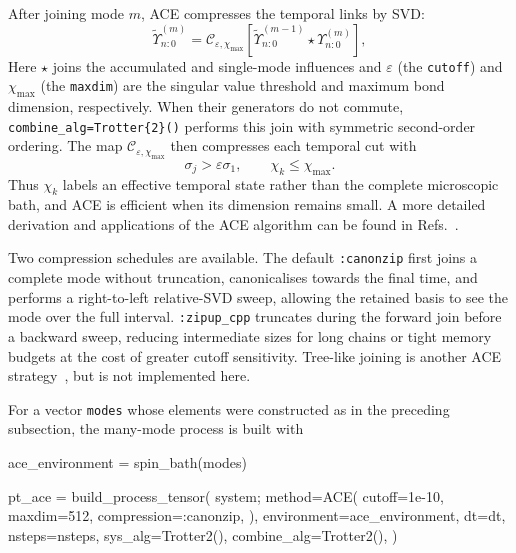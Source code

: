 After joining mode \(m\), ACE compresses the temporal links by SVD:
%
\begin{equation}
    \widetilde{\Upsilon}^{(m)}_{n:0}
    = \mathcal C_{\varepsilon,\chi_{\max}} \!\left[ \widetilde{\Upsilon}^{(m-1)}_{n:0} \star \Upsilon^{(m)}_{n:0} \right],
    \label{eq:ace-sequential-update}
\end{equation}
%
Here \(\star\) joins the accumulated and single-mode influences and \(\varepsilon\) (the \texttt{cutoff}) and \(\chi_{\max}\) (the \texttt{maxdim}) are the singular value threshold and maximum bond dimension, respectively.
When their generators do not commute, \texttt{combine\_alg=Trotter\{2\}()} performs this join with symmetric second-order ordering.
The map \(\mathcal C_{\varepsilon,\chi_{\max}}\) then compresses each temporal cut with
%
\begin{equation}
    \sigma_j>\varepsilon\sigma_1, \qquad \chi_k\leq\chi_{\max}.
    \label{eq:ace-relative-truncation}
\end{equation}
%
Thus \(\chi_k\) labels an effective temporal state rather than the complete microscopic bath, and ACE is efficient when its dimension remains small.
A more detailed derivation and applications of the ACE algorithm can be found in Refs.~\cite{Cygorek2022,CygorekGauger2024,LacroixReview2026}.

Two compression schedules are available.
The default \texttt{:canonzip} first joins a complete mode without truncation, canonicalises towards the final time, and performs a right-to-left relative-SVD sweep, allowing the retained basis to see the mode over the full interval.
\texttt{:zipup\_cpp} truncates during the forward join before a backward sweep, reducing intermediate sizes for long chains or tight memory budgets at the cost of greater cutoff sensitivity.
Tree-like joining is another ACE strategy~\cite{Cygorek2024Treelike}, but is not implemented here.

For a vector \texttt{modes} whose elements were constructed as in the preceding subsection, the many-mode process is built with
%
\begin{juliacode}[
  caption={ACE construction for a bath of independent microscopic modes.},
  label={lst:pt-build-ace},
]
ace_environment = spin_bath(modes)

pt_ace = build_process_tensor(
    system;
    method=ACE(
        cutoff=1e-10,
        maxdim=512,
        compression=:canonzip,
    ),
    environment=ace_environment,
    dt=dt,
    nsteps=nsteps,
    sys_alg=Trotter{2}(),
    combine_alg=Trotter{2}(),
)
\end{juliacode}
%

